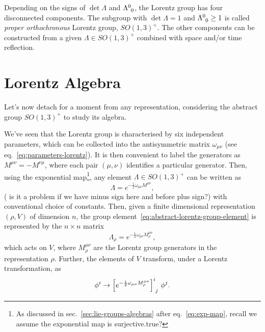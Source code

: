 Depending on the signs of $\det \Lambda$ and $\tensor{\Lambda}{^0_0}$, the Lorentz group has four disconnected components. The subgroup with $\det \Lambda = 1$ and $\tensor{\Lambda}{^0_0} \geq 1$ is called \emph{proper orthochronous} Lorentz group, $SO(1,3)^+$. The other components can be constructed from a given $\Lambda \in SO(1,3)^+$ combined with space and/or time reflection.


\section{Lorentz Algebra}\label{sec:lorentz-algebra}
Let's now detach for a moment from any representation, considering the abstract group $SO(1,3)^+$ to study its algebra.

We've seen that the Lorentz group is characterised by six independent parameters, which can be collected into the antisymmetric matrix $\omega_{\mu\nu}$ (see eq.~\eqref{eq:parameters-lorentz}). It is then convenient to label the generators as $M^{\mu\nu} = -M^{\nu\mu}$, where each pair $(\mu,\nu)$ identifies a particular generator. Then, using the exponential map\footnote{As discussed in sec.~\ref{sec:lie-groups-algebras} after eq.~\eqref{eq:exp-map}, recall we assume the exponential map is surjective.\color{red}true?\color{black}}, any element $\Lambda \in SO(1,3)^+$ can be written as
\begin{equation}\label{eq:abstract-lorentz-group-element}
   \Lambda = e^{-\frac{i}{2} \omega_{\mu\nu} M^{\mu\nu}},
\end{equation}
(\color{red} is it a problem if we have minus sign here and before plus sign?\color{black}) with conventional choice of constants. Then, given a finite dimensional representation $(\rho, V)$ of dimension $n$, the group element~\eqref{eq:abstract-lorentz-group-element} is represented by the $n \times n$ matrix
\begin{equation}
    \Lambda_\rho = e^{-\frac{i}{2} \omega_{\mu\nu} M^{\mu\nu}_\rho},
\end{equation}
which acts on $V$, where $M^{\mu\nu}_\rho$ are the Lorentz group generators in the representation $\rho$. Further, the elements of $V$ transform, under a Lorentz transformation, as
\begin{equation}
    \phi^i \to \tensor{\left[ e^{-\frac{i}{2} \omega_{\mu\nu} M^{\mu\nu}_\rho} \right]}{^i_j}  \, \phi^j .
\end{equation}

